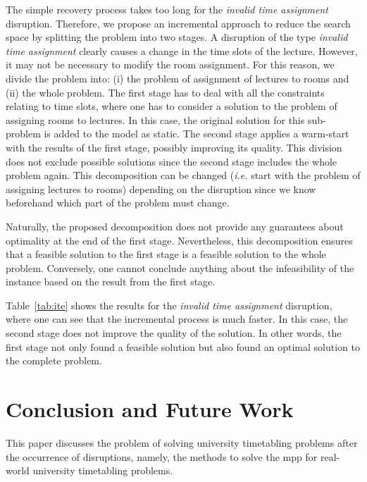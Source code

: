 \documentclass[twocolumn,natbib]{svjour3}          %
\newcounter{constraint}
\begin{document}
The simple recovery process takes too long for the \textit{invalid time assignment} disruption. Therefore, we propose an incremental approach to reduce the search space by splitting the problem into two stages.  A disruption of the type \textit{invalid time assignment} clearly causes a change in the time slots of the lecture. However, it may not be necessary to modify the room assignment. For this reason, we divide the problem into: (i) the problem of assignment of lectures to rooms and (ii) the whole problem. The first stage has to deal with all the constraints relating to time slots, where one has to consider a solution to the problem of assigning rooms to lectures. In this case, the original solution for this sub-problem is added to the model as static. The second stage applies a warm-start with the results of the first stage, possibly improving its quality. This division does not exclude possible solutions since the second stage includes the whole problem again. This decomposition can be changed (\emph{i.e.} start with the problem of assigning lectures to rooms) depending on the disruption since we know beforehand which part of the problem must change. 

Naturally, the proposed decomposition does not provide any guarantees about optimality at the end of the first stage. Nevertheless, this decomposition ensures that a feasible solution to the first stage is a feasible solution to the whole problem. Conversely, one cannot conclude anything about the infeasibility of the instance based on the result from the first stage.  

Table~\ref{tab:ite} shows the results for the \textit{invalid time assignment} disruption, where one can see that the incremental process is much faster. In this case, the second stage does not improve the quality of the solution. In other words, the first stage not only found a feasible solution but also found an optimal solution to the complete problem. %





\section{Conclusion and Future Work}\label{sec:con}

This paper discusses the problem of solving university timetabling problems after the occurrence of disruptions, namely, the methods to solve the \gls{mpp} for real-world university timetabling problems.
\end{document}
